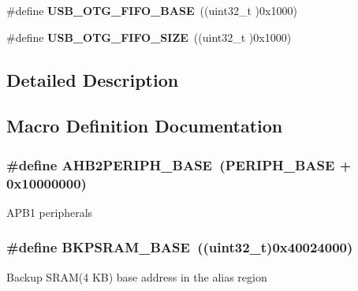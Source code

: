 \begin{DoxyCompactItemize}
\item 
\#define {\bfseries U\+S\+B\+\_\+\+O\+T\+G\+\_\+\+F\+I\+F\+O\+\_\+\+B\+A\+SE}~((uint32\+\_\+t )0x1000)\hypertarget{group___peripheral__memory__map_gace340350802904868673f0e839c4fa04}{}\label{group___peripheral__memory__map_gace340350802904868673f0e839c4fa04}

\item 
\#define {\bfseries U\+S\+B\+\_\+\+O\+T\+G\+\_\+\+F\+I\+F\+O\+\_\+\+S\+I\+ZE}~((uint32\+\_\+t )0x1000)\hypertarget{group___peripheral__memory__map_ga8781c4b2406c740d9fe540737a6a0188}{}\label{group___peripheral__memory__map_ga8781c4b2406c740d9fe540737a6a0188}

\end{DoxyCompactItemize}


\subsection{Detailed Description}


\subsection{Macro Definition Documentation}
\subsubsection[{\texorpdfstring{A\+H\+B2\+P\+E\+R\+I\+P\+H\+\_\+\+B\+A\+SE}{AHB2PERIPH_BASE}}]{\setlength{\rightskip}{0pt plus 5cm}\#define A\+H\+B2\+P\+E\+R\+I\+P\+H\+\_\+\+B\+A\+SE~({\bf P\+E\+R\+I\+P\+H\+\_\+\+B\+A\+SE} + 0x10000000)}\hypertarget{group___peripheral__memory__map_gaeedaa71d22a1948492365e2cd26cfd46}{}\label{group___peripheral__memory__map_gaeedaa71d22a1948492365e2cd26cfd46}
A\+P\+B1 peripherals 
\subsubsection[{\texorpdfstring{B\+K\+P\+S\+R\+A\+M\+\_\+\+B\+A\+SE}{BKPSRAM_BASE}}]{\setlength{\rightskip}{0pt plus 5cm}\#define B\+K\+P\+S\+R\+A\+M\+\_\+\+B\+A\+SE~((uint32\+\_\+t)0x40024000)}\hypertarget{group___peripheral__memory__map_ga52e57051bdf8909222b36e5408a48f32}{}\label{group___peripheral__memory__map_ga52e57051bdf8909222b36e5408a48f32}
Backup S\+R\+A\+M(4 K\+B) base address in the alias region 
